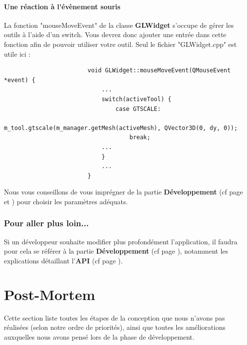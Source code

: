 \documentclass[a4paper]{memoir}
\begin{document}
				\subsubsection{Une réaction à l'évènement souris}
					La fonction "mouseMoveEvent" de la classe \textbf{GLWidget} s'occupe de gérer les outils à l'aide d'un switch. Vous devrez donc ajouter 
					une entrée dans cette fonction afin de pouvoir utiliser votre outil. Seul le fichier "GLWidget.cpp" est utile ici :
					\begin{verbatim}
						void GLWidget::mouseMoveEvent(QMouseEvent *event) {
						    ...
						    switch(activeTool) {
						        case GTSCALE:
						            m_tool.gtscale(m_manager.getMesh(activeMesh), QVector3D(0, dy, 0));
						            break;
						    ...
						    }
						    ...
						}
					\end{verbatim}
					Nous vous conseillons de vous imprégner de la partie \textbf{Développement} (cf page \pageref{tool-dev} et \pageref{glwidget-dev}) pour 
					choisir les paramètres adéquats.
				
			\subsection{Pour aller plus loin...}
				Si un développeur souhaite modifier plus profondément l'application, il faudra pour cela se référer à la partie \textbf{Développement} (cf 
				page \pageref{dev}), notamment les explications détaillant l'\textbf{API} (cf page \pageref{api-dev}).

	\chapter{Post-Mortem}
		Cette section liste toutes les étapes de la conception que nous n'avons pas réalisées (selon notre ordre de priorités), ainsi que toutes les 
		améliorations auxquelles nous avons pensé lors de la phase de développement.
		
\end{document}
